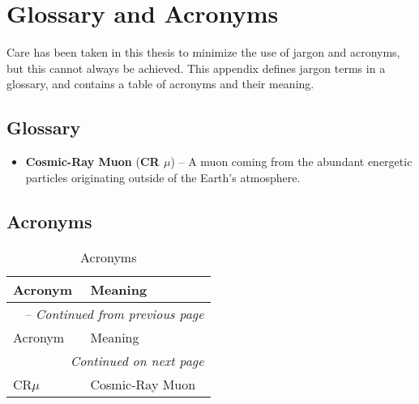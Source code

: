 \chapter{Glossary and Acronyms}
\label{app_glossary}

Care has been taken in this thesis to minimize the use of jargon and
acronyms, but this cannot always be achieved.  This appendix defines
jargon terms in a glossary, and contains a table of acronyms and their
meaning.

\section{Glossary}
\label{sec_glossary}

\begin{itemize}

\item \textbf{Cosmic-Ray Muon} (\textbf{CR $\mu$}) -- A muon coming from
the abundant energetic particles originating outside of the Earth's
atmosphere.

\end{itemize}


\section{Acronyms}
\label{sec_acronym}


\begin{longtable}{p{} p{}}
\caption{Acronyms} \label{tab:acronyms} \\

\toprule
Acronym & Meaning \\
\midrule
\endfirsthead

\multicolumn{2}{l}{\textit{\tablename\ \thetable{} -- Continued from previous page}} \\
\toprule
Acronym & Meaning \\
\midrule
\endhead

\multicolumn{2}{r}{\textit{Continued on next page}} \\
\bottomrule
\endfoot

\bottomrule
\endlastfoot


CR$\mu$ & Cosmic-Ray Muon \\

\end{longtable}

